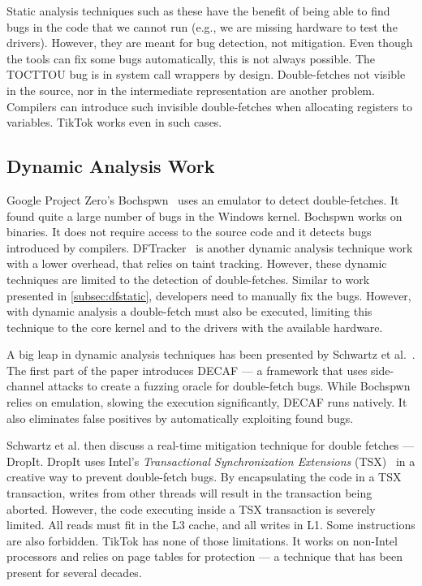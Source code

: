 \documentclass[conference]{IEEEtran}
\newcommand{\sysname}{TikTok}
\begin{document}
Static analysis techniques such as these have the benefit of being able to find
bugs in the code that we cannot run (e.g., we are missing hardware to test the
drivers). However, they are meant for bug detection, not mitigation. Even though
the tools can fix some bugs automatically, this is not always possible. The
TOCTTOU bug is in system call wrappers by design. Double-fetches not visible in
the source, nor in the intermediate representation are another problem.
Compilers can introduce such invisible double-fetches when allocating registers
to variables. \sysname{} works even in such cases.


\subsection{Dynamic Analysis Work}
\label{subsec:dfdynamic}
Google Project Zero's Bochspwn~\cite{jurczyk2013bochspwn} uses an emulator to
detect double-fetches. It found quite a large number of bugs in the Windows
kernel. Bochspwn works on binaries. It does not require access to the source
code and it detects bugs introduced by compilers.
DFTracker~\cite{wang2019dftracker} is another dynamic analysis technique work
with a lower overhead, that relies on taint tracking. However, these dynamic
techniques are limited to the detection of double-fetches. Similar to work
presented in \autoref{subsec:dfstatic}, developers need to manually fix the bugs.
However, with dynamic analysis a double-fetch must also be executed, limiting
this technique to the core kernel and to the drivers with the available
hardware.

A big leap in dynamic analysis techniques has been presented by Schwartz et
al.~\cite{schwarz2018automated}. The first part of the paper introduces DECAF
--- a framework that uses side-channel attacks to create a fuzzing oracle for
double-fetch bugs. While Bochspwn relies on emulation, slowing the execution
significantly, DECAF runs natively. It also eliminates false positives by
automatically exploiting found bugs.

Schwartz et al. then discuss a real-time mitigation technique for double
fetches --- DropIt. DropIt uses Intel's \emph{Transactional Synchronization 
Extensions} (TSX)~\cite{intel64and} in a creative way to prevent double-fetch
bugs. By encapsulating the code in a TSX transaction, writes from other threads
will result in the
transaction being aborted. However, the code executing inside a TSX transaction
is severely limited. All reads must fit in the L3 cache, and all writes in L1.
Some instructions are also forbidden. \sysname{} has none of those limitations.
It works on non-Intel processors and relies on page tables for protection --- a
technique that has been present for several decades.
\end{document}
